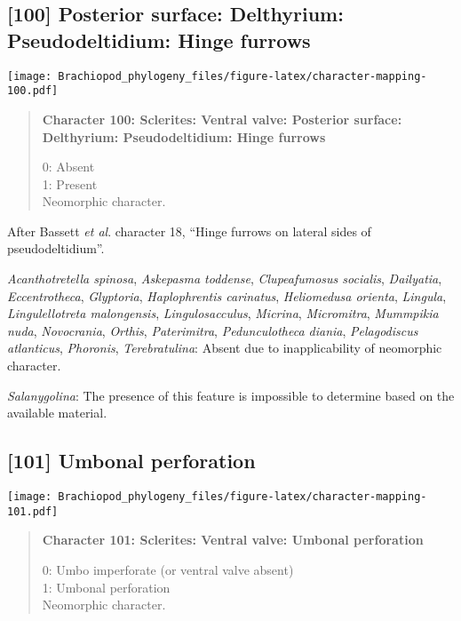 \documentclass[openany]{book}
\theoremstyle{definition}
\theoremstyle{definition}
\theoremstyle{definition}
\theoremstyle{remark}
\begin{document}
\subsection*{{[}100{]} Posterior surface: Delthyrium: Pseudodeltidium:
Hinge
furrows}\label{posterior-surface-delthyrium-pseudodeltidium-hinge-furrows}

\texttt{[image: Brachiopod\_phylogeny\_files/figure-latex/character-mapping-100.pdf]}

\begin{quote}
\textbf{Character 100: Sclerites: Ventral valve: Posterior surface:
Delthyrium: Pseudodeltidium: Hinge furrows}

0: Absent\\
1: Present\\
Neomorphic character.
\end{quote}

After Bassett \emph{et al}.
\citeyearpar{Bassett2001Functionalmorphology} character 18, ``Hinge
furrows on lateral sides of pseudodeltidium''.

\hypertarget{Acanthotretella_spinosa-coding-100}{}
\emph{Acanthotretella spinosa}, \emph{Askepasma toddense},
\emph{Clupeafumosus socialis}, \emph{Dailyatia}, \emph{Eccentrotheca},
\emph{Glyptoria}, \emph{Haplophrentis carinatus}, \emph{Heliomedusa
orienta}, \emph{Lingula}, \emph{Lingulellotreta malongensis},
\emph{Lingulosacculus}, \emph{Micrina}, \emph{Micromitra},
\emph{Mummpikia nuda}, \emph{Novocrania}, \emph{Orthis},
\emph{Paterimitra}, \emph{Pedunculotheca diania}, \emph{Pelagodiscus
atlanticus}, \emph{Phoronis}, \emph{Terebratulina}: Absent due to
inapplicability of neomorphic character.

\hypertarget{Salanygolina-coding-100}{}
\emph{Salanygolina}: The presence of this feature is impossible to
determine based on the available material.

\subsection*{{[}101{]} Umbonal perforation}\label{umbonal-perforation}

\texttt{[image: Brachiopod\_phylogeny\_files/figure-latex/character-mapping-101.pdf]}

\begin{quote}
\textbf{Character 101: Sclerites: Ventral valve: Umbonal perforation}

0: Umbo imperforate (or ventral valve absent)\\
1: Umbonal perforation\\
Neomorphic character.
\end{quote}
\end{document}
